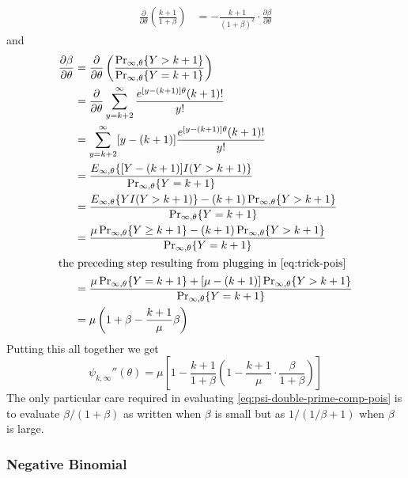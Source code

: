 \documentclass[11pt]{article}
\newcommand{\Prsub}[1]{\Pr\nolimits_{#1}}
\begin{document}
\begin{align*}
   \frac{\partial}{\partial \theta}
   \left(
   \frac{k + 1}{1 + \beta}
   \right)
   & =
   -
   \frac{k + 1}{(1 + \beta)^2}
   \cdot
   \frac{\partial \beta}{\partial \theta}
\end{align*}
and
\begin{align*}
   \frac{\partial \beta}{\partial \theta}
   & =
   \frac{\partial}{\partial \theta}
   \left(
   \frac{\Prsub{\infty, \theta}\{Y > k + 1 \}}
   {\Prsub{\infty, \theta}\{Y = k + 1 \}}
   \right)
   \\
   & =
   \frac{\partial}{\partial \theta}
   \sum_{y = k + 2}^\infty \frac{e^{[y - (k + 1)] \theta} (k + 1) !}{y !}
   \\
   & =
   \sum_{y = k + 2}^\infty [y - (k + 1)]
   \frac{e^{[y - (k + 1)] \theta} (k + 1) !}{y !}
   \\
   & =
   \frac{E_{\infty, \theta} \{ [Y - (k + 1)] I(Y > k + 1) \}}
   {\Prsub{\infty, \theta}\{Y = k + 1 \}}
   \\
   & =
   \frac{E_{\infty, \theta} \{ Y I(Y > k + 1) \} -
   (k + 1) \Prsub{\infty, \theta} \{ Y > k + 1 \} }
   {\Prsub{\infty, \theta}\{Y = k + 1 \}}
   \\
   & =
   \frac{ \mu \Prsub{\infty, \theta}\{Y \ge k + 1 \} -
   (k + 1) \Prsub{\infty, \theta} \{ Y > k + 1 \} }
   {\Prsub{\infty, \theta}\{Y = k + 1 \}}
   \\
\intertext{the preceding step resulting from plugging in \eqref{eq:trick-pois}}
   & =
   \frac{ \mu \Prsub{\infty, \theta}\{Y = k + 1 \} +
   [\mu - (k + 1)] \Prsub{\infty, \theta} \{ Y > k + 1 \} }
   {\Prsub{\infty, \theta}\{Y = k + 1 \}}
   \\
   & =
   \mu \left( 1 + \beta - \frac{k + 1}{\mu} \beta \right)
\end{align*}
Putting this all together we get
\begin{equation} \label{eq:psi-double-prime-comp-pois}
   \psi_{k, \infty}''(\theta)
   =
   \mu
   \left[ 1 - \frac{k + 1}{1 + \beta}
   \left( 1 - \frac{k + 1}{\mu} \cdot \frac{\beta}{1 + \beta} \right) \right]
\end{equation}
The only particular care required in
evaluating \eqref{eq:psi-double-prime-comp-pois} is to evaluate
$\beta / (1 + \beta)$ as written when $\beta$ is small but
as $1 / (1 / \beta + 1)$ when $\beta$ is large.

\subsubsection{Negative Binomial}
\end{document}

